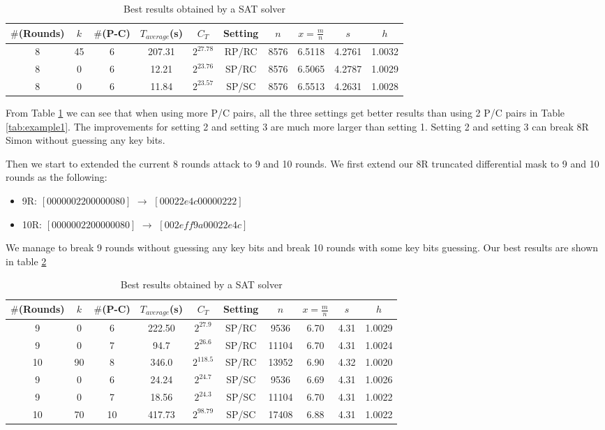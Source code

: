\begin{table}[!hh]
	\caption{Best results obtained by a SAT solver}\label{tab:8RmorePC} \centering
	\begin{tabular}{|c|c|c|c|c|c|c|c|c|c|}
		\hline
		$\#$(Rounds) & $k$ & $\#$(P-C) & $T_{average}$(s) & $C_T$ & Setting & $n$ & $x=\frac{m}{n}$ & $s$ & $h$ \\
		\hline
		8 & 45 & 6 & 207.31   & $2^{27.78}$ & RP/RC & 8576	& 6.5118	& 4.2761	& 1.0032 \\
		\hline
		8 & 0  & 6 & 12.21   & $2^{23.76}$ & SP/RC  & 8576	& 6.5065	& 4.2787	& 1.0029  \\
		\hline
		8 & 0  & 6 & 11.84   & $2^{23.57}$ & SP/SC  & 8576	& 6.5513	& 4.2631	& 1.0028 \\
		\hline
	\end{tabular}
\end{table}

From Table \ref{tab:8RmorePC} we can see that when using more P/C pairs, all the three settings get better results than using 2 P/C pairs in Table \ref{tab:example1}. The improvements for setting 2 and setting 3 are much more larger than setting 1. Setting 2 and setting 3 can break 8R Simon without guessing any key bits.

Then we start to extended the current 8 rounds attack to 9 and 10 rounds. We first extend our 8R truncated differential mask to 9 and 10 rounds as the following:
\begin{itemize}
	\item 9R: $[00000022 00000080]$ $\rightarrow$ $[00022e4c 00000222]$
	\item 10R: $[00000022 00000080]$ $\rightarrow$ $[002eff9a 00022e4c]$ 
\end{itemize}

We manage to break 9 rounds without guessing any key bits and break 10 rounds with some key bits guessing. Our best results are shown in table \ref{tab:10RmorePC}

\begin{table}[!hh]
	\caption{Best results obtained by a SAT solver}\label{tab:10RmorePC} \centering
	\begin{tabular}{|c|c|c|c|c|c|c|c|c|c|}
		\hline
		$\#$(Rounds) & $k$ & $\#$(P-C) & $T_{average}$(s) & $C_T$ & Setting & $n$ & $x=\frac{m}{n}$ & $s$ & $h$ \\
		\hline
		9 & 0 & 6 & 222.50   & $2^{27.9}$ & SP/RC & 9536	& 6.70	& 4.31	& 1.0029 \\
		9 & 0 & 7 & 94.7   & $2^{26.6}$ & SP/RC & 11104	& 6.70	& 4.31	& 1.0024 \\
		10 & 90 & 8 & 346.0   & $2^{118.5}$ & SP/RC & 13952	& 6.90	& 4.32	& 1.0020 \\
		\hline
		9 & 0  & 6 & 24.24   & $2^{24.7}$ & SP/SC  & 9536	& 6.69	& 4.31	& 1.0026  \\
		9 & 0  & 7 & 18.56   & $2^{24.3}$ & SP/SC  & 11104	& 6.70	& 4.31	& 1.0022  \\
		10 & 70  & 10 & 417.73   & $2^{98.79}$ & SP/SC  & 17408	& 6.88	& 4.31	& 1.0022  \\
		\hline
	\end{tabular}
\end{table}

